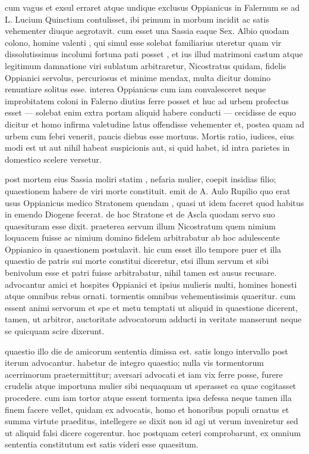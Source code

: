  cum vagus et exsul erraret atque undique exclusus Oppianicus in Falernum se ad L. Lucium Quinctium contulisset, ibi primum in morbum incidit ac satis vehementer diuque aegrotavit. cum esset una Sassia eaque Sex. Albio quodam colono, homine valenti , qui simul esse solebat familiarius uteretur quam vir dissolutissimus incolumi fortuna pati posset , et ius illud matrimoni castum atque legitimum damnatione viri sublatum arbitraretur, Nicostratus quidam, fidelis Oppianici servolus, percuriosus et minime mendax, multa dicitur domino renuntiare solitus esse. interea Oppianicus cum iam convalesceret neque improbitatem coloni in Falerno diutius ferre posset et huc ad urbem profectus esset — solebat enim extra portam aliquid habere conducti — cecidisse de equo dicitur et homo infirma valetudine latus offendisse vehementer et, postea quam ad urbem cum febri venerit, paucis diebus esse mortuus. Mortis ratio, iudices, eius modi est ut aut nihil habeat suspicionis aut, si quid habet, id intra parietes in domestico scelere versetur.

 post mortem eius Sassia moliri statim , nefaria mulier, coepit insidias filio; quaestionem habere de viri morte constituit. emit de A. Aulo Rupilio quo erat usus Oppianicus medico Stratonem quendam , quasi ut idem faceret quod habitus in emendo Diogene fecerat. de hoc Stratone et de Ascla quodam servo suo quaesituram esse dixit. praeterea servum illum Nicostratum quem nimium loquacem fuisse ac nimium domino fidelem arbitrabatur ab hoc adulescente Oppianico in quaestionem postulavit. hic cum esset illo tempore puer et illa quaestio de patris sui morte constitui diceretur, etsi illum servum et sibi benivolum esse et patri fuisse arbitrabatur, nihil tamen est ausus recusare. advocantur amici et hospites Oppianici et ipsius mulieris multi, homines honesti atque omnibus rebus ornati. tormentis omnibus vehementissimis quaeritur. cum essent animi servorum et spe et metu temptati ut aliquid in quaestione dicerent, tamen, ut arbitror, auctoritate advocatorum adducti in veritate manserunt neque se quicquam scire dixerunt.

 quaestio illo die de amicorum sententia dimissa est. satis longo intervallo post iterum advocantur. habetur de integro quaestio; nulla vis tormentorum acerrimorum praetermittitur; aversari advocati et iam vix ferre posse, furere crudelis atque importuna mulier sibi nequaquam ut sperasset ea quae cogitasset procedere. cum iam tortor atque essent tormenta ipsa defessa neque tamen illa finem facere vellet, quidam ex advocatis, homo et honoribus populi ornatus et summa virtute praeditus, intellegere se dixit non id agi ut verum inveniretur sed ut aliquid falsi dicere cogerentur. hoc postquam ceteri comprobarunt, ex omnium sententia constitutum est satis videri esse quaesitum.


